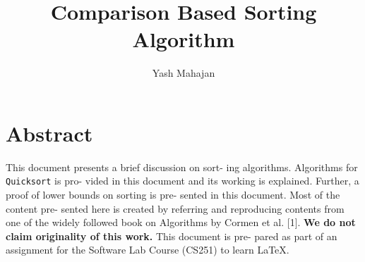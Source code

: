 \documentclass[a4paper,10pt,twocolumn]{article}
\title{\huge{Comparison Based Sorting Algorithm}}
\author{{Yash Mahajan}}
\date{\vspace{-5ex}}
\begin{document}
\maketitle
\section*{Abstract}
This document presents a brief discussion on sort-
ing algorithms. Algorithms for \texttt{Quicksort} is pro-
vided in this document and its working is explained.
Further, a proof of lower bounds on sorting is pre-
sented in this document. Most of the content pre-
sented here is created by referring and reproducing
contents from one of the widely followed book on
Algorithms by Cormen et al. [1]. \textbf{We do not claim
originality of this work.} This document is pre-
pared as part of an assignment for the Software Lab
Course (CS251) to learn \LaTeX.\\
\end{document}
